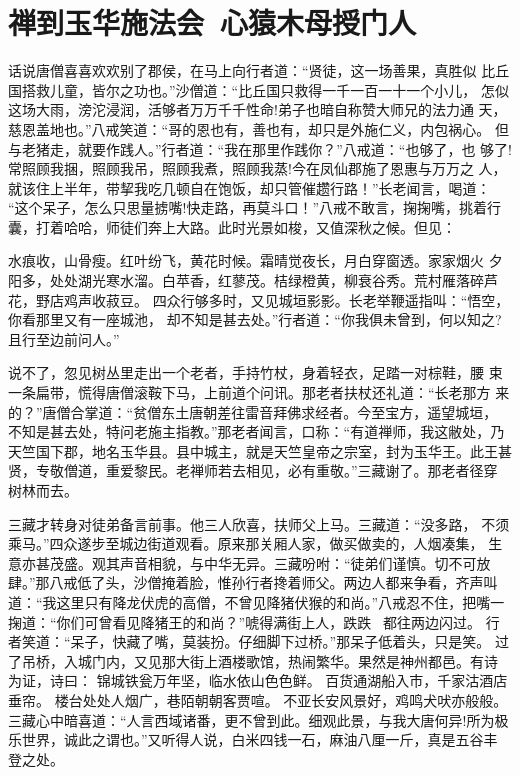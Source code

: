 \chapter{禅到玉华施法会~心猿木母授门人}

话说唐僧喜喜欢欢别了郡侯，在马上向行者道：“贤徒，这一场善果，真胜似
比丘国搭救儿童，皆尔之功也。”沙僧道：“比丘国只救得一千一百一十一个小儿，
怎似这场大雨，滂沱浸润，活够者万万千千性命!弟子也暗自称赞大师兄的法力通
天，慈恩盖地也。”八戒笑道：“哥的恩也有，善也有，却只是外施仁义，内包祸心。
但与老猪走，就要作践人。”行者道：“我在那里作践你？”八戒道：“也够了，也
够了!常照顾我捆，照顾我吊，照顾我煮，照顾我蒸!今在凤仙郡施了恩惠与万万之
人，就该住上半年，带挈我吃几顿自在饱饭，却只管催趱行路！”长老闻言，喝道：
“这个呆子，怎么只思量掳嘴!快走路，再莫斗口！”八戒不敢言，掬掬嘴，挑着行
囊，打着哈哈，师徒们奔上大路。此时光景如梭，又值深秋之候。但见：

水痕收，山骨瘦。红叶纷飞，黄花时候。霜晴觉夜长，月白穿窗透。家家烟火
夕阳多，处处湖光寒水溜。白苹香，红蓼茂。桔绿橙黄，柳衰谷秀。荒村雁落碎芦
花，野店鸡声收菽豆。
四众行够多时，又见城垣影影。长老举鞭遥指叫：“悟空，你看那里又有一座城池，
却不知是甚去处。”行者道：“你我俱未曾到，何以知之?且行至边前问人。”

说不了，忽见树丛里走出一个老者，手持竹杖，身着轻衣，足踏一对棕鞋，腰
束一条扁带，慌得唐僧滚鞍下马，上前道个问讯。那老者扶杖还礼道：“长老那方
来的？”唐僧合掌道：“贫僧东土唐朝差往雷音拜佛求经者。今至宝方，遥望城垣，
不知是甚去处，特问老施主指教。”那老者闻言，口称：“有道禅师，我这敝处，乃
天竺国下郡，地名玉华县。县中城主，就是天竺皇帝之宗室，封为玉华王。此王甚
贤，专敬僧道，重爱黎民。老禅师若去相见，必有重敬。”三藏谢了。那老者径穿
树林而去。

三藏才转身对徒弟备言前事。他三人欣喜，扶师父上马。三藏道：“没多路，
不须乘马。”四众遂步至城边街道观看。原来那关厢人家，做买做卖的，人烟凑集，
生意亦甚茂盛。观其声音相貌，与中华无异。三藏吩咐：“徒弟们谨慎。切不可放
肆。”那八戒低了头，沙僧掩着脸，惟孙行者搀着师父。两边人都来争看，齐声叫
道：“我这里只有降龙伏虎的高僧，不曾见降猪伏猴的和尚。”八戒忍不住，把嘴一
掬道：“你们可曾看见降猪王的和尚？”唬得满街上人，跌跌，都往两边闪过。
行者笑道：“呆子，快藏了嘴，莫装扮。仔细脚下过桥。”那呆子低着头，只是笑。
过了吊桥，入城门内，又见那大街上酒楼歌馆，热闹繁华。果然是神州都邑。有诗
为证，诗曰：
锦城铁瓮万年坚，临水依山色色鲜。
百货通湖船入市，千家沽酒店垂帘。
楼台处处人烟广，巷陌朝朝客贾喧。
不亚长安风景好，鸡鸣犬吠亦般般。
三藏心中暗喜道：“人言西域诸番，更不曾到此。细观此景，与我大唐何异!所为极
乐世界，诚此之谓也。”又听得人说，白米四钱一石，麻油八厘一斤，真是五谷丰
登之处。


